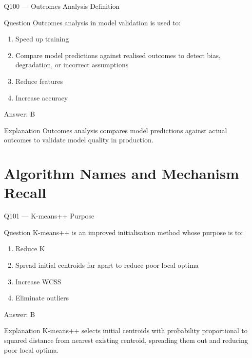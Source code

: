 \documentclass[aspectratio=169,8pt]{beamer}
\begin{document}
	\begin{frame}{Q100 --- Outcomes Analysis Definition}
		\begin{block}{Question}
			Outcomes analysis in model validation is used to:
			\begin{enumerate}
				\item Speed up training
				\item Compare model predictions against realised outcomes to detect bias, degradation, or incorrect assumptions
				\item Reduce features
				\item Increase accuracy
			\end{enumerate}
		\end{block}
		\begin{exampleblock}{Answer: B}\end{exampleblock}
		\begin{block}{Explanation}
			Outcomes analysis compares model predictions against actual outcomes to validate model quality in production.
		\end{block}
	\end{frame}
	
	\section{Algorithm Names and Mechanism Recall}
	
	\begin{frame}{Q101 --- K-means++ Purpose}
		\begin{block}{Question}
			K-means++ is an improved initialisation method whose purpose is to:
			\begin{enumerate}
				\item Reduce K
				\item Spread initial centroids far apart to reduce poor local optima
				\item Increase WCSS
				\item Eliminate outliers
			\end{enumerate}
		\end{block}
		\begin{exampleblock}{Answer: B}\end{exampleblock}
		\begin{block}{Explanation}
			K-means++ selects initial centroids with probability proportional to squared distance from nearest existing centroid, spreading them out and reducing poor local optima.
		\end{block}
	\end{frame}
	
\end{document}
